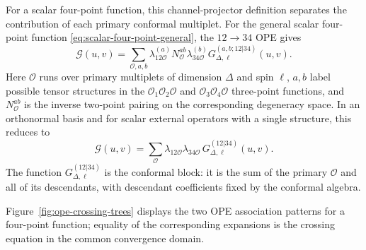 For a scalar four-point function, this channel-projector definition separates
the contribution of each primary conformal multiplet.  For the general scalar
four-point function
\eqref{eq:scalar-four-point-general}, the \(12\to34\) OPE gives
\begin{equation}
  \mathcal G(u,v)
  =
  \sum_{\mathcal O,a,b}
  \lambda_{12\mathcal O}^{(a)}
  N_{\mathcal O}^{ab}
  \lambda_{34\mathcal O}^{(b)}
  G_{\Delta,\ell}^{(a,b;12|34)}(u,v).
  \label{eq:general-scalar-conformal-block-expansion}
\end{equation}
Here \(\mathcal O\) runs over primary multiplets of dimension \(\Delta\) and
spin \(\ell\), \(a,b\) label possible tensor structures in the
\(\mathcal O_1\mathcal O_2\mathcal O\) and
\(\mathcal O_3\mathcal O_4\mathcal O\) three-point functions, and
\(N_{\mathcal O}^{ab}\) is the inverse two-point pairing on the corresponding
degeneracy space.  In an orthonormal basis and for scalar external operators
with a single structure, this reduces to
\[
  \mathcal G(u,v)
  =
  \sum_{\mathcal O}
  \lambda_{12\mathcal O}\lambda_{34\mathcal O}\,
  G_{\Delta,\ell}^{(12|34)}(u,v).
\]
The function \(G_{\Delta,\ell}^{(12|34)}\) is the conformal block: it is the
sum of the primary \(\mathcal O\) and all of its descendants, with descendant
coefficients fixed by the conformal algebra.

Figure~\ref{fig:ope-crossing-trees} displays the two OPE association patterns
for a four-point function; equality of the corresponding expansions is the
crossing equation in the common convergence domain.

